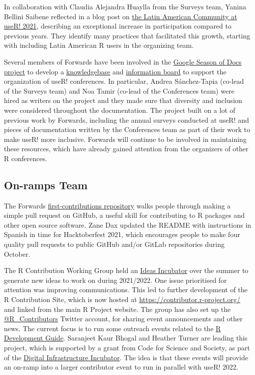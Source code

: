 In collaboration with Claudia Alejandra Huaylla from the Surveys team,
Yanina Bellini Saibene reflected in a blog post on
\href{https://user2021.r-project.org/blog/2021/11/26/latines_at_user/}{the
Latin American Community at useR! 2021}, describing an exceptional
increase in participation compared to previous years. They identify many
practices that facilitated this growth, starting with including Latin
American R users in the organizing team.

Several members of Forwards have been involved in the
\href{https://developers.google.com/season-of-docs/docs/participants}{Google
Season of Docs project} to develop a
\href{https://bit.ly/knowledgebase-rj}{knowledgebase} and
\href{https://bit.ly/3fA5r61}{information board} to support the
organization of useR! conferences. In particular, Andrea Sánchez-Tapia
(co-lead of the Surveys team) and Noa Tamir (co-lead of the Conferences
team) were hired as writers on the project and they made sure that
diversity and inclusion were considered throughout the documentation.
The project built on a lot of previous work by Forwards, including the
annual surveys conducted at useR! and pieces of documentation written by
the Conferences team as part of their work to make useR! more inclusive.
Forwards will continue to be involved in maintaining these resources,
which have already gained attention from the organizers of other R
conferences.

\hypertarget{on-ramps-team}{%
\subsection{On-ramps Team}\label{on-ramps-team}}

The Forwards
\href{https://github.com/forwards/first-contributions}{first-contributions
repository} walks people through making a simple pull request on GitHub,
a useful skill for contributing to R packages and other open source
software. Zane Dax updated the README with instructions in Spanish in
time for Hacktoberfest 2021, which encourages people to make four
quality pull requests to public GitHub and/or GitLab repositories during
October.

The R Contribution Working Group held an
\href{https://github.com/r-devel/rcontribution/blob/main/ideas_incubator.md}{Ideas
Incubator} over the summer to generate new ideas to work on during
2021/2022. One issue prioritised for attention was improving
communications. This led to further development of the R Contribution
Site, which is now hosted at \url{https://contributor.r-project.org/}
and linked from the main R Project website. The group has also set up
the \href{https://twitter.com/R_Contributors}{@R\_Contributors} Twitter
account, for sharing event announcements and other news. The current
focus is to run some outreach events related to the
\href{https://contributor.r-project.org/rdevguide/}{R Development
Guide}. Saranjeet Kaur Bhogal and Heather Turner are leading this
project, which is supported by a grant from Code for Science and
Society, as part of the
\href{https://incubator.codeforscience.org/cohort}{Digital
Infrastructure Incubator}. The idea is that these events will provide an
on-ramp into a larger contributor event to run in parallel with useR!
2022.

